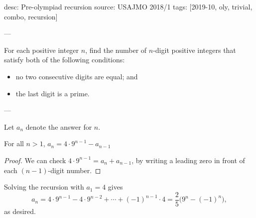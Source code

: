 desc: Pre-olympiad recursion
source: USAJMO 2018/1
tags: [2019-10, oly, trivial, combo, recursion]

---

For each positive integer $n$, find the number of $n$-digit positive integers that satisfy both of the following conditions:
\begin{itemize}[itemsep=0em]
    \item no two consecutive digits are equal; and
    \item the last digit is a prime.
\end{itemize}

---

Let $a_n$ denote the answer for $n$.
\begin{claim*}
    For all $n>1$, $a_n=4\cdot9^{n-1}-a_{n-1}$
\end{claim*}
\begin{proof}
    We can check $4\cdot9^{n-1}=a_n+a_{n-1}$, by writing a leading zero in front of each $(n-1)$-digit number.
\end{proof}

Solving the recursion with $a_1=4$ gives \[a_n=4\cdot9^{n-1}-4\cdot9^{n-2}+\cdots+(-1)^{n-1}\cdot4=\frac25\big(9^n-(-1)^n\big),\]
as desired.


